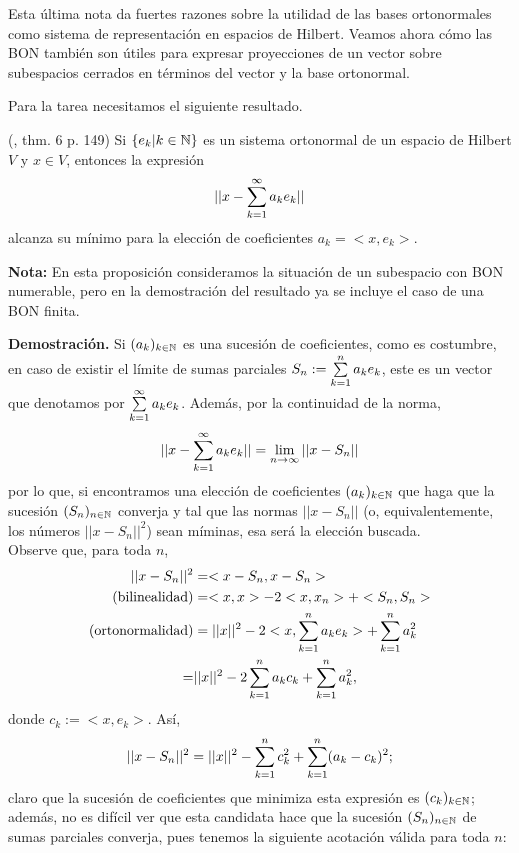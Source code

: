 Esta última nota da fuertes razones sobre la utilidad
de las bases ortonormales como sistema de representación
en espacios de Hilbert. Veamos ahora cómo
las BON también son útiles para expresar proyecciones
de un vector sobre subespacios cerrados en términos del
vector y la base ortonormal. 

Para la tarea necesitamos el siguiente resultado.


\begin{prop} \label{teo: Kol 6, p.149}
(\cite{kolmogorov}, thm. 6 p. 149)
Si $\{ e_{k} |k \in \mathbb{N} \}$ es un sistema
ortonormal de un espacio de Hilbert $V$ 
y $x \in V$, entonces la expresión
\[
|| x - \sum\limits_{k=1}^{\infty}a_{k}e_{k}  ||
\]
alcanza su mínimo para la elección de coeficientes
$a_{k}= <x , e_{k} > $.
\end{prop}

\noindent
\textbf{Nota:}
En esta proposición consideramos la situación de un subespacio
con BON numerable, pero en la demostración del resultado ya
se incluye el caso de una BON finita.

\noindent
\textbf{Demostración.}
Si $(a_{k})_{k \in \mathbb{N}}$ es una sucesión de coeficientes,
como es costumbre,
en caso de existir el límite de sumas parciales
$S_{n}:= \sum\limits_{k=1}^{n}a_{k}e_{k}$, este es un vector que denotamos
por $\sum\limits_{k=1}^{\infty}a_{k}e_{k}$. Además,
por la continuidad de la norma,
\[
||x - \sum\limits_{k=1}^{\infty}a_{k}e_{k} || = \lim\limits_{n \rightarrow \infty }{||x-S_{n}||}
\]
por lo que, si encontramos una elección de coeficientes $(a_{k})_{k \in \mathbb{N}}$
que haga que
la sucesión $(S_{n})_{n \in \mathbb{N}}$ converja y tal que las normas
$||x-S_{n}||$ (o, equivalentemente, los números $||x-S_{n}||^{2}$)
sean míminas, esa será la elección buscada. \\
Observe que, para toda $n$,
\begin{align*}
||x-S_{n}||^{2} & = <x-S_{n} , x-S_{n} > \\
\text{(bilinealidad)} & =  <x, x > - 2 < x, x_{n} > + <S_{n} , S_{n}  > \\
\text{(ortonormalidad)} & =  ||x||^{2} - 2 < x ,\sum\limits_{k=1}^{n}a_{k}e_{k} > + 
\sum\limits_{k=1}^{n}a_{k}^{2} \\
= & ||x||^{2} - 2\sum\limits_{k=1}^{n}a_{k}c_{k}  + 
\sum\limits_{k=1}^{n}a_{k}^{2},
\end{align*}
donde $c_{k}:= < x , e_{k} >$. Así,
\[
||x-S_{n}||^{2} = ||x||^{2} - \sum\limits_{k=1}^{n}c_{k}^{2}  + 
\sum\limits_{k=1}^{n}(a_{k}-c_{k})^{2};
\]
claro que la sucesión de coeficientes que minimiza
esta expresión es $(c_{k})_{k \in \mathbb{N}}$; además, no es difícil ver
que esta candidata hace que la sucesión $(S_{n})_{n \in \mathbb{N}}$
de sumas parciales converja, pues tenemos la siguiente acotación
válida para toda $n$:

